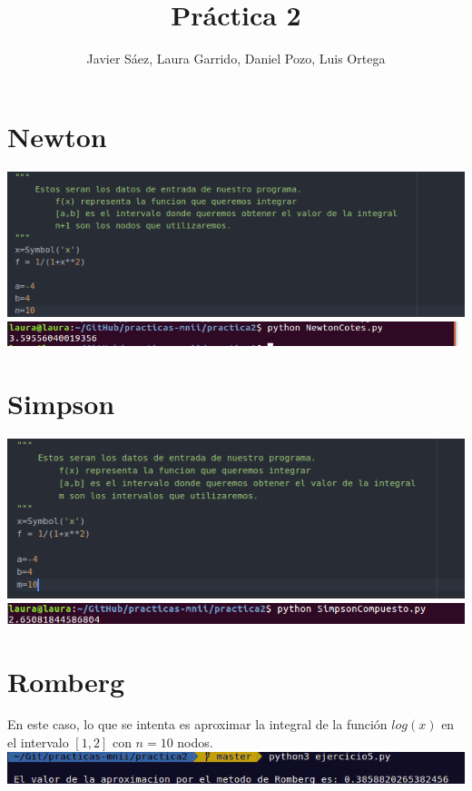 \documentclass[11pt]{article}
\title{\textbf{Práctica 2}}
\author{Javier Sáez, Laura Garrido, Daniel Pozo, Luis Ortega}
\date{}
\begin{document}
\maketitle
\section{Newton}
\includegraphics[scale=0.6]{n1}
\includegraphics[scale=0.6]{n2}

\section{Simpson}
\includegraphics[scale=0.6]{s1}
\includegraphics[scale=0.6]{s2}

\section{Romberg}
En este caso, lo que se intenta es aproximar la integral de la función $log(x)$ en el intervalo $[1,2]$ con $n=10$ nodos.
\includegraphics[scale=0.6]{r1}
\end{document}
